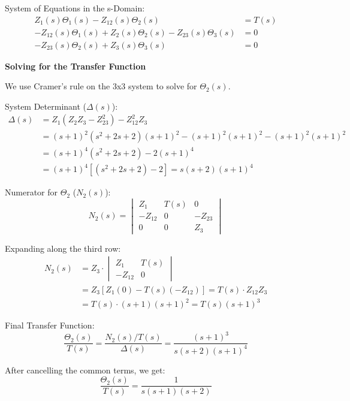 \documentclass[11pt]{article}
\begin{document}
{System of Equations in the s-Domain:}
\begin{align}
    Z_1(s)\Theta_1(s) - Z_{12}(s)\Theta_2(s) &= T(s) \tag{1}\\
    -Z_{12}(s)\Theta_1(s) + Z_2(s)\Theta_2(s) - Z_{23} (s)\Theta_3(s) &= 0 \tag{2}\\
    -Z_{23}(s)\Theta_2(s) + Z_3(s)\Theta_3(s) &= 0 \tag{3}
\end{align}

\newpage
\noindent\textbf{Solving for the Transfer Function}

\vspace{8pt}

We use Cramer's rule on the 3x3 system to solve for $\Theta_2(s)$.
\vspace{5pt}

{System Determinant ($\Delta(s)$):}
\begin{align*}
    \Delta(s) &= Z_1(Z_2Z_3 - Z_{23}^2) - Z_{12}^2Z_3 \\
    &= (s+1)^2(s^2+2s+2)(s+1)^2 - (s+1)^2(s+1)^2 - (s+1)^2(s+1)^2 \\
    &= (s+1)^4(s^2+2s+2) - 2(s+1)^4 \\
    &= (s+1)^4[(s^2+2s+2)-2] = s(s+2)(s+1)^4
\end{align*}

{Numerator for $\Theta_2$ ($N_2(s)$):}
\[
N_2(s) = \begin{vmatrix} Z_1 & T(s) & 0 \\ -Z_{12} & 0 & -Z_{23} \\ 0 & 0 & Z_3 \end{vmatrix}
\]

Expanding along the third row:
\begin{align*}
    N_2(s) &= Z_3 \cdot \begin{vmatrix} Z_1 & T(s) \\ -Z_{12} & 0 \end{vmatrix} \\
    &= Z_3 [Z_1(0) - T(s)(-Z_{12})] = T(s) \cdot Z_{12}Z_3 \\
    &= T(s) \cdot (s+1)(s+1)^2 = T(s)(s+1)^3
\end{align*}

{Final Transfer Function:}
\[
\frac{\Theta_2(s)}{T(s)} = \frac{N_2(s)/T(s)}{\Delta(s)} = \frac{(s+1)^3}{s(s+2)(s+1)^4}
\]

After cancelling the common terms, we get:
\[
\boxed{\frac{\Theta_2(s)}{T(s)} = \frac{1}{s(s+1)(s+2)}}
\]
\end{document}
